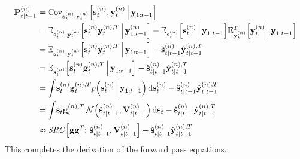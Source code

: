 		\begin{align}
			\boldsymbol{\mathrm{P}}_{t \vert t - 1}^{(n)}
				&= \operatorname{Cov}_{\boldsymbol{\mathrm{s}}_t^{(n)}, \boldsymbol{\mathrm{y}}_t^{(n)}}\!\Big[\boldsymbol{\mathrm{s}}_t^{(n)}, \boldsymbol{\mathrm{y}}_t^{(n)} \,\Big\vert\, \boldsymbol{\mathrm{y}}_{1:t - 1}\Big]  \nonumber \\
				&= \mathbb{E}_{\boldsymbol{\mathrm{s}}_t^{(n)}, \boldsymbol{\mathrm{y}}_t^{(n)}}\Big[\boldsymbol{\mathrm{s}}_t^{(n)} \boldsymbol{\mathrm{y}}_t^{(n), T} \,\Big\vert\, \boldsymbol{\mathrm{y}}_{1:t - 1}^{(n)}\Big] - \mathbb{E}_{\boldsymbol{\mathrm{s}}_t^{(n)}}\Big[\boldsymbol{\mathrm{s}}_t^{(n)} \,\Big\vert\, \boldsymbol{\mathrm{y}}_{1:t - 1}\Big] \mathbb{E}_{\boldsymbol{\mathrm{y}}_t^{(n)}}^T\Big[\boldsymbol{\mathrm{y}}_t^{(n)} \,\Big\vert\, \boldsymbol{\mathrm{y}}_{1:t - 1}\Big]  \nonumber \\
				&= \mathbb{E}_{\boldsymbol{\mathrm{s}}_t^{(n)}, \boldsymbol{\mathrm{y}}_t^{(n)}}\Big[\boldsymbol{\mathrm{s}}_t^{(n)} \boldsymbol{\mathrm{y}}_t^{(n), T} \,\Big\vert\, \boldsymbol{\mathrm{y}}_{1:t - 1}\Big] - \hat{\boldsymbol{\mathrm{s}}}_{t \vert t - 1}^{(n)} \hat{\boldsymbol{\mathrm{y}}}_{t \vert t - 1}^{(n), T}  \nonumber \\
				&= \mathbb{E}_{\boldsymbol{\mathrm{s}}_t^{(n)}}\Big[\boldsymbol{\mathrm{s}}_t^{(n)} \boldsymbol{\mathrm{g}}_t^{(n), T} \,\Big\vert\, \boldsymbol{\mathrm{y}}_{1:t - 1}\Big] - \hat{\boldsymbol{\mathrm{s}}}_{t \vert t - 1}^{(n)} \hat{\boldsymbol{\mathrm{y}}}_{t \vert t - 1}^{(n), T}  \nonumber \\
				&= \int\! \boldsymbol{\mathrm{s}}_t^{(n)} \boldsymbol{\mathrm{g}}_t^{(n), T} p\Big(\boldsymbol{\mathrm{s}}_t^{(n)} \,\Big\vert\, \boldsymbol{\mathrm{y}}_{1:t - 1}\Big) \dd{\boldsymbol{\mathrm{s}}_t^{(n)}} - \hat{\boldsymbol{\mathrm{s}}}_{t \vert t - 1}^{(n)} \hat{\boldsymbol{\mathrm{y}}}_{t \vert t - 1}^{(n), T}  \nonumber \\
				&= \int\! \boldsymbol{\mathrm{s}}_t \boldsymbol{\mathrm{g}}_t^{(n), T} \,\mathcal{N}\Big(\hat{\boldsymbol{\mathrm{s}}}_{t \vert t - 1}^{(n)}, \boldsymbol{\mathrm{V}}_{t \vert t - 1}^{(n)}\Big) \dd{\boldsymbol{\mathrm{s}}_t} - \hat{\boldsymbol{\mathrm{s}}}_{t \vert t - 1}^{(n)} \hat{\boldsymbol{\mathrm{y}}}_{t \vert t - 1}^{(n), T}  \nonumber \\
				&\approx \mathit{SRC}\Big[ \boldsymbol{\mathrm{g}} \boldsymbol{\mathrm{g}}^T;\, \hat{\boldsymbol{\mathrm{s}}}_{t \vert t - 1}^{(n)}, \boldsymbol{\mathrm{V}}_{t \vert t - 1}^{(n)} \Big] - \hat{\boldsymbol{\mathrm{s}}}_{t \vert t - 1}^{(n)} \hat{\boldsymbol{\mathrm{y}}}_{t \vert t - 1}^{(n), T}  \label{eq:cubatureK}
		\end{align}
		This completes the derivation of the forward pass equations.

